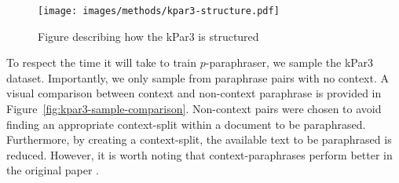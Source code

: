 \documentclass{l4proj}
\theoremstyle{definition}
\begin{document}
        \begin{figure}[h]
            \centering
            \texttt{[image: images/methods/kpar3-structure.pdf]}
            \caption{Figure describing how the kPar3 is structured}
            \label{fig:kpar3-structure}
        \end{figure}
        
        To respect the time it will take to train $p$-paraphraser, we sample the kPar3 dataset. Importantly, we only sample from paraphrase pairs with no context. A visual comparison between context and non-context paraphrase is provided in Figure~\ref{fig:kpar3-sample-comparison}. Non-context pairs were chosen to avoid finding an appropriate context-split within a document to be paraphrased. Furthermore, by creating a context-split, the available text to be paraphrased is reduced. However, it is worth noting that context-paraphrases perform better in the original paper \citep{krishna2023paraphrasing}.
            
\end{document}
